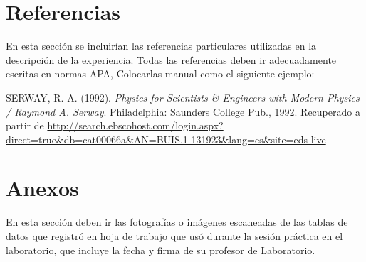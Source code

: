 \documentclass[11pt]{article}
\begin{document}
\section*{Referencias}
	\vspace*{-0.35cm} %
En esta sección se incluirían las referencias particulares utilizadas en la descripción de la experiencia. Todas las referencias deben ir adecuadamente escritas en normas APA, Colocarlas manual como el siguiente ejemplo:

%
%

%

SERWAY, R. A. (1992). \textit{Physics for Scientists \& Engineers with Modern Physics / Raymond A. Serway}. Philadelphia: Saunders College Pub., 1992. Recuperado a partir de \url{http://search.ebscohost.com/login.aspx?direct=true&db=cat00066a&AN=BUIS.1-131923&lang=es&site=eds-live}

\vspace*{-0.70cm} %
\section*{Anexos}
	\vspace*{-0.35cm}
En esta sección deben ir las fotografías o imágenes escaneadas de las tablas de datos que registró en hoja de trabajo que usó durante la sesión práctica en el laboratorio, que incluye la fecha y firma de su profesor de Laboratorio.
\end{document}
